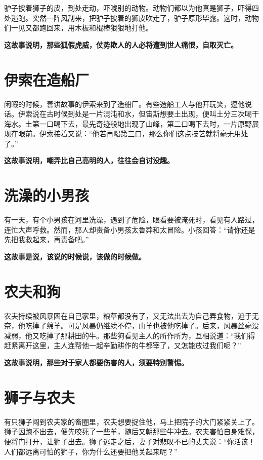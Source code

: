 驴子披着狮子的皮，到处走动，吓唬别的动物。动物们都以为他真是狮子，吓得四处逃跑。突然一阵风刮来，把驴子披着的狮皮吹走了，驴子原形毕露。这时，动物们一见又都跑回来，用木板和棍棒狠狠地打他。

{\bfseries \color{red}这故事说明，那些狐假虎威，仗势欺人的人必将遭到世人痛恨，自取灭亡。}

\section{伊索在造船厂}

闲暇的时候，善讲故事的伊索来到了造船厂。有些造船工人与他开玩笑，逗他说话。伊索说在古时候到处是一片混沌和水，但宙斯想要土出现，便叫土分三次喝干海水。土第一口喝下去，最先奇迹般地出现了山峰，第二口喝下去时，一片原野展现在眼前。伊索接着又说：“他若再喝第三口，那么你们这点技艺就将毫无用处了。”

{\bfseries \color{red}这故事说明，嘲弄比自己高明的人，往往会自讨没趣。}

\section{洗澡的小男孩}

有一天，有个小男孩在河里洗澡，遇到了危险，眼看要被淹死时，看见有人路过，连忙大声呼救。然而，那人却责备小男孩太鲁莽和太冒险。小孩回答：“请你还是先把我救起来，再责备吧。”

{\bfseries \color{red}这故事是说，该说的时候说，该做的时候做。}

\section{农夫和狗}

农夫持续被风暴困在自己家里，粮草都没有了，又无法出去为自己弄食物，迫于无奈，他吃掉了绵羊。可是风暴仍继续不停，山羊也被他吃掉了。后来，风暴丝毫没减弱，他又吃掉了那耕田的牛。那些狗看见主人的所作所为，互相说道：“我们得赶紧离开这里，主人连帮他一起辛勤耕作的牛都宰了，又怎能放过我们呢？”

{\bfseries \color{red}这故事说明，那些对于家人都要伤害的人，须要特别警惕。}

\section{狮子与农夫}

有只狮子闯到农夫家的畜圈里，农夫想要捉住他，马上把院子的大门紧紧关上了。狮子因跑不出去，便先咬死了一些羊，随后又朝那些牛冲去。农夫害怕自身难保，便将门打开，让狮子出去。狮子逃走之后，妻子对悲叹不已的丈夫说：“你活该！人们都远离可怕的狮子，你为什么还要把他关起来呢？”

